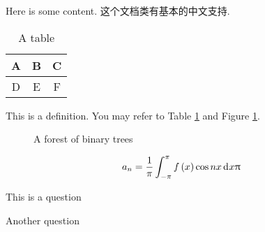 \documentclass[english]{pkupaper}
\title{\titlemark}
\author{\authoring}
\begin{document}
	\maketitle

Here is some content. 这个文档类有基本的中文支持.

\lipsum[1]

\begin{table}[htbp]
\caption{A table} \label{Tbl:ATable}
\centering
\begin{tabular}{c|cc}
A & B & C \\
\hline
D & E & F
\end{tabular}
\end{table}

\begin{thmdefinition}
This is a definition. You may refer to Table \ref{Tbl:ATable} and Figure \ref{Fig:BinaryTreeForest}.
\end{thmdefinition}

\begin{figure}[htbp]
\centering
{}
\caption{A forest of binary trees} \label{Fig:BinaryTreeForest}
\end{figure}

\begin{equation}
a_n = \frac{1}{\pi} \int_{-\pi}^{\pi}{ f \left( x \right) \cos n x \mathop{\mathrm{d}^{} \!} x } \uppi
\end{equation}

\begin{thmquestion}[label]
This is a question
\end{thmquestion}

\begin{thmquestion}
Another question
\end{thmquestion}
\end{document}
